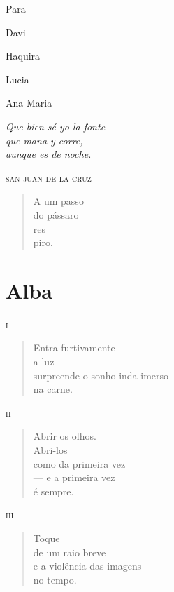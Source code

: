 \thispagestyle{empty}

\mbox{}
\vfill
Para

Davi

Haquira

Lucia

Ana Maria

\pagebreak
\thispagestyle{empty}

\mbox{}
\vfill
\setlength{\epigraphwidth}{.3\textwidth}
\epigraph{\emph{Que bien sé yo la fonte}\\
\emph{que mana y corre,}\\
\emph{aunque es de noche.}}{\textsc{san juan de la cruz}}

\pagebreak
\thispagestyle{empty}

\mbox{}\vfill
\begin{verse}
A um passo\\
do pássaro\\
res\\
piro.
\end{verse}

\chapter{Alba}

\forceindent\textsc{i}

\begin{verse}
Entra furtivamente\\
a luz\\
surpreende o sonho inda imerso\\
\qquad\qquad\qquad\qquad\qquad na carne.
\end{verse}

\medskip
\textsc{ii}

\begin{verse}
Abrir os olhos.\\
Abri-los\\
como da primeira vez\\
--- e a primeira vez\\
\quad é sempre.
\end{verse}

\medskip
\textsc{iii}\\

\begin{verse}
Toque\\
de um raio breve\\
e a violência das imagens\\
no tempo.
\end{verse}


